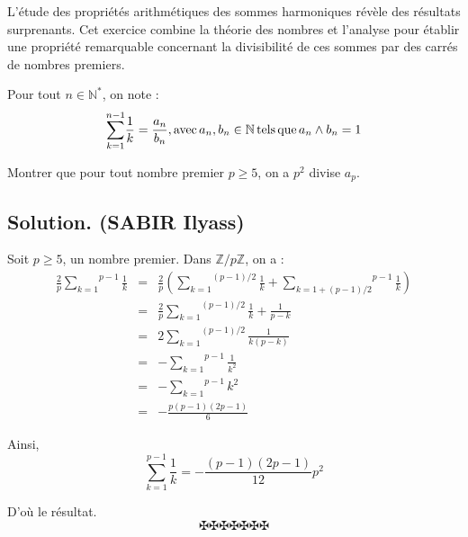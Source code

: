 L'{\'e}tude des propri{\'e}t{\'e}s arithm{\'e}tiques des sommes harmoniques
r{\'e}v{\`e}le des r{\'e}sultats surprenants. Cet exercice combine la
th{\'e}orie des nombres et l'analyse pour {\'e}tablir une propri{\'e}t{\'e}
remarquable concernant la divisibilit{\'e} de ces sommes par des carr{\'e}s de
nombres premiers.
\begin{exercise}[(le th{\'e}or{\`e}me de Wolstenholme)]
Pour tout $n \in \mathbb{N}^{\ast}$, on note :
\[ \overset{n - 1}{\underset{k = 1}{\sum}} \frac{1}{k} = \frac{a_n}{b_n},
   \operatorname{avec} a_n, b_n \in \mathbb{N} \operatorname{tels} \operatorname{que} a_n \wedge b_n =
   1 \]
   
Montrer que pour tout nombre premier $p \geqslant 5$, on a $p^2$ divise $a_p$.

\end{exercise}

\subsection*{Solution. (SABIR Ilyass)}


Soit $p \geqslant 5$, un nombre premier. Dans $\mathbb{Z}/ p\mathbb{Z}$, on a
:
\begin{eqnarray*}
  \frac{2}{p} \overset{p - 1}{\underset{k = 1}{\sum}} \frac{1}{k} & = &
  \frac{2}{p} \left( \overset{(p - 1) / 2}{\underset{k = 1}{\sum}} \frac{1}{k}
  + \overset{p - 1}{\underset{k = 1 + (p - 1) / 2}{\sum}} \frac{1}{k}
  \right)\\
  & = & \frac{2}{p} \overset{(p - 1) / 2}{\underset{k = 1}{\sum}} \frac{1}{k}
  + \frac{1}{p - k}\\
  & = & 2 \overset{(p - 1) / 2}{\underset{k = 1}{\sum}} \frac{1}{k (p - k)}\\
  & = & - \overset{p - 1}{\underset{k = 1}{\sum}} \frac{1}{k^2}\\
  & = & - \overset{p - 1}{\underset{k = 1}{\sum}} k^2\\
  & = & - \frac{p (p - 1) (2 p - 1)}{6}
\end{eqnarray*}


Ainsi,
\[ \overset{p - 1}{\underset{k = 1}{\sum}} \frac{1}{k} = - \frac{(p - 1) (2 p
   - 1)}{12} p^2 \]


D'o{\`u} le r{\'e}sultat.
\[ \maltese \maltese \maltese \maltese \maltese \maltese \maltese \]